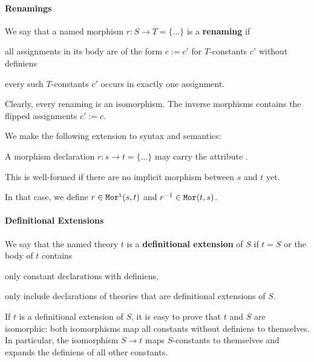 \paragraph{Renamings}
We say that a named morphism $r:S\to T=\{\ldots\}$ is a \textbf{renaming} if
\begin{compactitem}
 \item all assignments in its body are of the form $c:=c'$ for $T$-constants $c'$ without definiens
 \item every such $T$-constants $c'$ occurs in exactly one assignment.
\end{compactitem}
Clearly, every renaming is an isomorphism.
The inverse morphisms contains the flipped assignments $c':=c$.

We make the following extension to syntax and semantics:
\begin{compactitem}
  \item A morphism declaration $r:s\to t=\{\ldots\}$ may carry the attribute .
  \item This is well-formed if there are no implicit morphism between $s$ and $t$ yet.
  \item In that case, we define $r\in\mathtt{Mor^i}(s,t)$ and $r^{-1}\in\mathtt{Mor}(t,s)$.
\end{compactitem}


\paragraph{Definitional Extensions}
We say that the named theory $t$ is a \textbf{definitional extension} of $S$ if $t=S$ or the body of $t$ contains
\begin{compactitem}
 \item only constant declarations with definiens,
 \item only include declarations of theories that are definitional extensions of $S$.
\end{compactitem}

If $t$ is a definitional extension of $S$, it is easy to prove that $t$ and $S$ are isomorphic: both isomorphisms map all constants without definiens to themselves. In particular, the isomorphism $S\to t$ maps $S$-constants to themselves and expands the definiens of all other constants.

